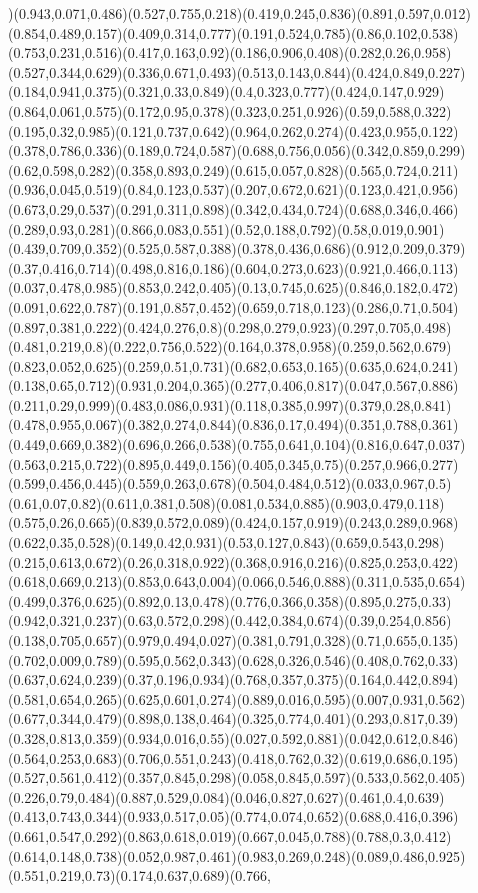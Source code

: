 {)(0.943,0.071,0.486)(0.527,0.755,0.218)(0.419,0.245,0.836)(0.891,0.597,0.012)(0.854,0.489,0.157)(0.409,0.314,0.777)(0.191,0.524,0.785)(0.86,0.102,0.538)(0.753,0.231,0.516)(0.417,0.163,0.92)(0.186,0.906,0.408)(0.282,0.26,0.958)(0.527,0.344,0.629)(0.336,0.671,0.493)(0.513,0.143,0.844)(0.424,0.849,0.227)(0.184,0.941,0.375)(0.321,0.33,0.849)(0.4,0.323,0.777)(0.424,0.147,0.929)(0.864,0.061,0.575)(0.172,0.95,0.378)(0.323,0.251,0.926)(0.59,0.588,0.322)(0.195,0.32,0.985)(0.121,0.737,0.642)(0.964,0.262,0.274)(0.423,0.955,0.122)(0.378,0.786,0.336)(0.189,0.724,0.587)(0.688,0.756,0.056)(0.342,0.859,0.299)(0.62,0.598,0.282)(0.358,0.893,0.249)(0.615,0.057,0.828)(0.565,0.724,0.211)(0.936,0.045,0.519)(0.84,0.123,0.537)(0.207,0.672,0.621)(0.123,0.421,0.956)(0.673,0.29,0.537)(0.291,0.311,0.898)(0.342,0.434,0.724)(0.688,0.346,0.466)(0.289,0.93,0.281)(0.866,0.083,0.551)(0.52,0.188,0.792)(0.58,0.019,0.901)(0.439,0.709,0.352)(0.525,0.587,0.388)(0.378,0.436,0.686)(0.912,0.209,0.379)(0.37,0.416,0.714)(0.498,0.816,0.186)(0.604,0.273,0.623)(0.921,0.466,0.113)(0.037,0.478,0.985)(0.853,0.242,0.405)(0.13,0.745,0.625)(0.846,0.182,0.472)(0.091,0.622,0.787)(0.191,0.857,0.452)(0.659,0.718,0.123)(0.286,0.71,0.504)(0.897,0.381,0.222)(0.424,0.276,0.8)(0.298,0.279,0.923)(0.297,0.705,0.498)(0.481,0.219,0.8)(0.222,0.756,0.522)(0.164,0.378,0.958)(0.259,0.562,0.679)(0.823,0.052,0.625)(0.259,0.51,0.731)(0.682,0.653,0.165)(0.635,0.624,0.241)(0.138,0.65,0.712)(0.931,0.204,0.365)(0.277,0.406,0.817)(0.047,0.567,0.886)(0.211,0.29,0.999)(0.483,0.086,0.931)(0.118,0.385,0.997)(0.379,0.28,0.841)(0.478,0.955,0.067)(0.382,0.274,0.844)(0.836,0.17,0.494)(0.351,0.788,0.361)(0.449,0.669,0.382)(0.696,0.266,0.538)(0.755,0.641,0.104)(0.816,0.647,0.037)(0.563,0.215,0.722)(0.895,0.449,0.156)(0.405,0.345,0.75)(0.257,0.966,0.277)(0.599,0.456,0.445)(0.559,0.263,0.678)(0.504,0.484,0.512)(0.033,0.967,0.5)(0.61,0.07,0.82)(0.611,0.381,0.508)(0.081,0.534,0.885)(0.903,0.479,0.118)(0.575,0.26,0.665)(0.839,0.572,0.089)(0.424,0.157,0.919)(0.243,0.289,0.968)(0.622,0.35,0.528)(0.149,0.42,0.931)(0.53,0.127,0.843)(0.659,0.543,0.298)(0.215,0.613,0.672)(0.26,0.318,0.922)(0.368,0.916,0.216)(0.825,0.253,0.422)(0.618,0.669,0.213)(0.853,0.643,0.004)(0.066,0.546,0.888)(0.311,0.535,0.654)(0.499,0.376,0.625)(0.892,0.13,0.478)(0.776,0.366,0.358)(0.895,0.275,0.33)(0.942,0.321,0.237)(0.63,0.572,0.298)(0.442,0.384,0.674)(0.39,0.254,0.856)(0.138,0.705,0.657)(0.979,0.494,0.027)(0.381,0.791,0.328)(0.71,0.655,0.135)(0.702,0.009,0.789)(0.595,0.562,0.343)(0.628,0.326,0.546)(0.408,0.762,0.33)(0.637,0.624,0.239)(0.37,0.196,0.934)(0.768,0.357,0.375)(0.164,0.442,0.894)(0.581,0.654,0.265)(0.625,0.601,0.274)(0.889,0.016,0.595)(0.007,0.931,0.562)(0.677,0.344,0.479)(0.898,0.138,0.464)(0.325,0.774,0.401)(0.293,0.817,0.39)(0.328,0.813,0.359)(0.934,0.016,0.55)(0.027,0.592,0.881)(0.042,0.612,0.846)(0.564,0.253,0.683)(0.706,0.551,0.243)(0.418,0.762,0.32)(0.619,0.686,0.195)(0.527,0.561,0.412)(0.357,0.845,0.298)(0.058,0.845,0.597)(0.533,0.562,0.405)(0.226,0.79,0.484)(0.887,0.529,0.084)(0.046,0.827,0.627)(0.461,0.4,0.639)(0.413,0.743,0.344)(0.933,0.517,0.05)(0.774,0.074,0.652)(0.688,0.416,0.396)(0.661,0.547,0.292)(0.863,0.618,0.019)(0.667,0.045,0.788)(0.788,0.3,0.412)(0.614,0.148,0.738)(0.052,0.987,0.461)(0.983,0.269,0.248)(0.089,0.486,0.925)(0.551,0.219,0.73)(0.174,0.637,0.689)(0.766,}
